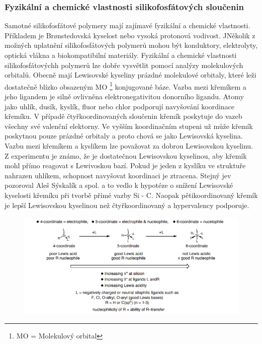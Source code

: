 \documentclass[
  digital, %
  table,   %
  lof,     %
  lot,     %
]{fithesis3}
\begin{document}
\subsubsection{Fyzikální a chemické vlastnosti silikofosfátových sloučenin}
Samotné silikofosfátové polymery mají zajímavé fyzikální a chemické vlastnosti. Příkladem je Brønstedovská kyselost nebo vysoká protonová vodivost. JNěkolik z možných uplatnění silikofosfátových polymerů mohou být konduktory, elektrolyty, optická vlákna a biokompatibilní materiály. Fyzikální a chemické vlastnosti silikofosfátovýchh polymerů lze dobře vysvětlit pomocí analýzy molekulových orbitalů. Obecně mají Lewisovské kyseliny prázdné molekulové orbitaly, které leži dostatečně blízko obsazeným MO \footnote{MO = Molekulový orbital} konjugované báze. Vazba mezi křemíkem a jeho ligandem je silně ovlivněna elektronegativitou donorního ligandu. Atomy jako uhlík, dusík, kyslík, fluor nebo chlor podporují navyšování koordinace křemíku. V případě čtyřkoordinovaných sloučenin křemík poskytuje do vazeb všechny své valenční elektorny. Ve vyšším koordinačním stupeni už může křemík poskytnou pouze prázdné orbitaly a proto chová se jako Lewisovská kyselina.\\

Vazbu mezi křemíkem a kyslíkem lze považovat za dobrou Lewisovskou kyselinu. Z experimentu je známo, že  je dostatečnou Lewisovskou kyselinou, aby křemík mohl přímo reagovat s Lewivoskou bazí. Pokud je jeden z kyslíku ve struktuře nahrazen uhlíkem, schopnost navyšovat koordinaci je ztracena. Stejný jev pozoroval Aleš Sýskalík a spol. \cite{Styskalik2015thesis} a to vedlo k hypotéze o snížení Lewisovské kyselosti křemíku při tvorbě přímé vazby Si - C. Naopak pětikoordinovaný křemík je lepší Lewisovskou kyselinou než čtyřkoordinovaný a hypervalency podporuje.\cite{Wagler2014}\\

\begin{figure}[h!]
\caption{\cite{hypervalentsiliconmacmillangroup2005}}
  \center
  \includegraphics[width=12cm]{schema_silicophosphates.png}
  \label{schema_silicon_coordinate}
  \end{figure}
\end{document}
